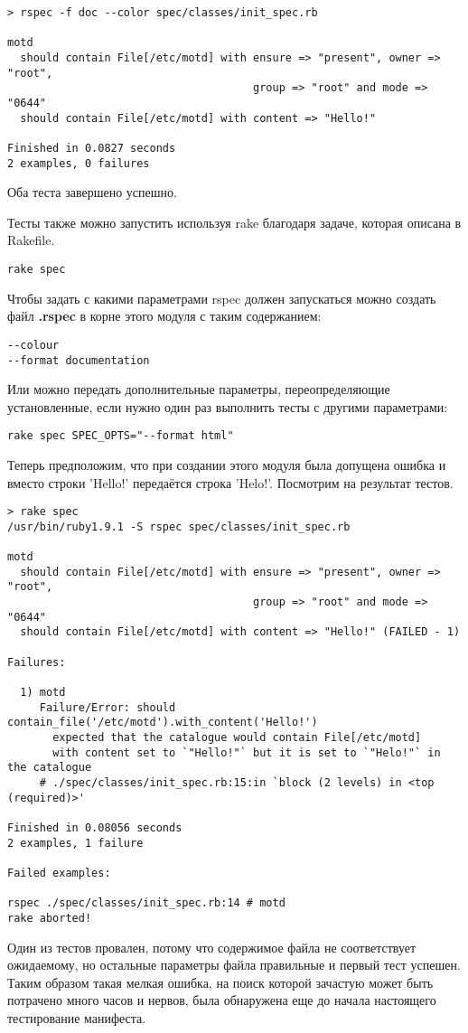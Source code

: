 \begin{verbatim}
> rspec -f doc --color spec/classes/init_spec.rb 

motd
  should contain File[/etc/motd] with ensure => "present", owner => "root",
                                      group => "root" and mode => "0644"
  should contain File[/etc/motd] with content => "Hello!"

Finished in 0.0827 seconds
2 examples, 0 failures
\end{verbatim}

Оба теста завершено успешно.

Тесты также можно запустить используя rake благодаря задаче, которая описана в Rakefile.

\begin{verbatim}
rake spec
\end{verbatim}

Чтобы задать с какими параметрами rspec должен запускаться можно создать файл \textbf{.rspec} в корне этого модуля с таким содержанием:

\begin{verbatim}
--colour
--format documentation
\end{verbatim}

Или можно передать дополнительные параметры, переопределяющие установленные, если нужно один раз выполнить тесты с другими параметрами:

\begin{verbatim}
rake spec SPEC_OPTS="--format html"
\end{verbatim}

Теперь предположим, что при создании этого модуля была допущена ошибка и вместо строки 'Hello!' передаётся строка 'Helo!'. Посмотрим на результат тестов.

\begin{verbatim}
> rake spec
/usr/bin/ruby1.9.1 -S rspec spec/classes/init_spec.rb

motd
  should contain File[/etc/motd] with ensure => "present", owner => "root",
                                      group => "root" and mode => "0644"
  should contain File[/etc/motd] with content => "Hello!" (FAILED - 1)

Failures:

  1) motd 
     Failure/Error: should contain_file('/etc/motd').with_content('Hello!')
       expected that the catalogue would contain File[/etc/motd]
       with content set to `"Hello!"` but it is set to `"Helo!"` in the catalogue
     # ./spec/classes/init_spec.rb:15:in `block (2 levels) in <top (required)>'

Finished in 0.08056 seconds
2 examples, 1 failure

Failed examples:

rspec ./spec/classes/init_spec.rb:14 # motd 
rake aborted!
\end{verbatim}

Один из тестов провален, потому что содержимое файла не соответствует ожидаемому, но остальные параметры файла правильные и первый тест успешен. Таким образом такая мелкая ошибка, на поиск которой зачастую может быть потрачено много часов и нервов, была обнаружена еще до начала настоящего тестирование манифеста.
